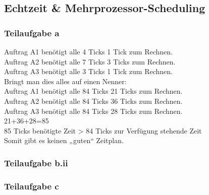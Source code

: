 \documentclass{article}
\newcommand{\sus}[1]{	%
	\subsection*{#1}
}
\newcommand{\sss}[1]{	%
	\subsubsection*{Teilaufgabe #1}
}
\begin{document}
\sus{Echtzeit \& Mehrprozessor-Scheduling}
\sss{a}
Auftrag A1 benötigt alle 4 Ticks 1 Tick zum Rechnen.\\
Auftrag A2 benötigt alle 7 Ticks 3 Ticks zum Rechnen.\\
Auftrag A3 benötigt alle 3 Ticks 1 Tick zum Rechnen.\\
Bringt man dies alles auf einen Nenner:\\
Auftrag A1 benötigt alle 84 Ticks 21 Ticks zum Rechnen.\\
Auftrag A2 benötigt alle 84 Ticks 36 Ticks zum Rechnen.\\
Auftrag A3 benötigt alle 84 Ticks 28 Ticks zum Rechnen.\\
21+36+28=85\\
85 Ticks benötigte Zeit > 84 Ticks zur Verfügung stehende Zeit\\
Somit gibt es keinen „guten“ Zeitplan.
\sss{b.ii}
\newpage
\sss{c}
\end{document}
